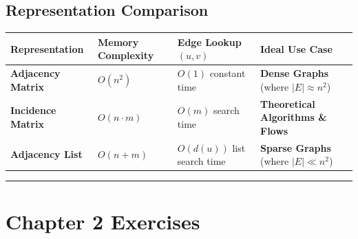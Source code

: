 \documentclass[
]{book}
\newcounter{none} %
\theoremstyle{definition}
\theoremstyle{definition}
\theoremstyle{definition}
\theoremstyle{definition}
\theoremstyle{remark}
\begin{document}
\subsection{Representation Comparison}\label{representation-comparison}

{\def\LTcaptype{none} %
\begin{longtable}[]{@{}
  >{\raggedright\arraybackslash}p{}
  >{\raggedright\arraybackslash}p{}
  >{\raggedright\arraybackslash}p{}
  >{\raggedright\arraybackslash}p{}@{}}
\toprule\noalign{}
\begin{minipage}[b]{\linewidth}\raggedright
Representation
\end{minipage} & \begin{minipage}[b]{\linewidth}\raggedright
Memory Complexity
\end{minipage} & \begin{minipage}[b]{\linewidth}\raggedright
Edge Lookup \((u, v)\)
\end{minipage} & \begin{minipage}[b]{\linewidth}\raggedright
Ideal Use Case
\end{minipage} \\
\midrule\noalign{}
\endhead
\bottomrule\noalign{}
\endlastfoot
\textbf{Adjacency Matrix} & \(O(n^2)\) & \(O(1)\) constant time & \textbf{Dense Graphs} (where \(\vert{}E\vert{} \approx n^2\)) \\
\textbf{Incidence Matrix} & \(O(n \cdot m)\) & \(O(m)\) search time & \textbf{Theoretical Algorithms \& Flows} \\
\textbf{Adjacency List} & \(O(n + m)\) & \(O(d(u))\) list search time & \textbf{Sparse Graphs} (where \(\vert{}E\vert{} \ll n^2\)) \\
\end{longtable}
}

\begin{center}\rule{0.5\linewidth}{0.5pt}\end{center}

\section{Chapter 2 Exercises}\label{chapter-2-exercises}
\end{document}
